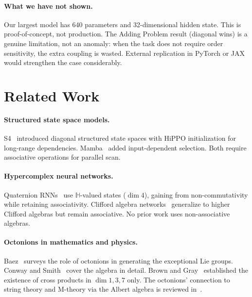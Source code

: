 \documentclass{article}
\newcommand{\HH}{\mathbb{H}}
\begin{document}
\paragraph{What we have not shown.}
Our largest model has 640 parameters and 32-dimensional hidden state.
This is proof-of-concept, not production.
The Adding Problem result (diagonal wins) is a genuine limitation, not an anomaly: when the task does not require order sensitivity, the extra coupling is wasted.
External replication in PyTorch or JAX would strengthen the case considerably.

\section{Related Work}

\paragraph{Structured state space models.}
S4~\cite{gu2022efficiently} introduced diagonal structured state spaces with HiPPO initialization for long-range dependencies.
Mamba~\cite{gu2024mamba} added input-dependent selection.
Both require associative operations for parallel scan.

\paragraph{Hypercomplex neural networks.}
Quaternion RNNs~\cite{parcollet2019quaternion} use $\HH$-valued states ($\dim 4$), gaining from non-commutativity while retaining associativity.
Clifford algebra networks~\cite{brandstetter2023clifford} generalize to higher Clifford algebras but remain associative.
No prior work uses non-associative algebras.

\paragraph{Octonions in mathematics and physics.}
Baez~\cite{baez2002octonions} surveys the role of octonions in generating the exceptional Lie groups.
Conway and Smith~\cite{conway2003quaternions} cover the algebra in detail.
Brown and Gray~\cite{brown1967vector} established the existence of cross products in $\dim 1, 3, 7$ only.
The octonions' connection to string theory and M-theory via the Albert algebra is reviewed in~\cite{baez2002octonions}.
\end{document}
